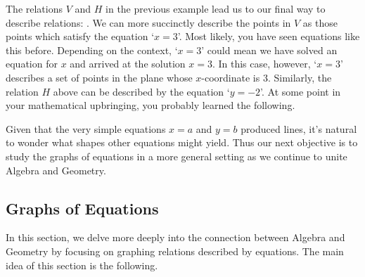 {\begin{enumerate}
\end{enumerate}
}

\medskip

The relations $V$ and $H$ in the previous example lead us to our final way to describe relations:   .  We can more succinctly describe the points in $V$ as those points which satisfy the equation `$x = 3$'.  Most likely, you have seen equations like this before.  Depending on the context, `$x = 3$' could mean we have solved an equation for $x$ and arrived at the solution $x=3$. In this case, however, `$x = 3$' describes a set of points in the plane whose $x$-coordinate is $3$.  Similarly, the relation $H$ above can be described by the equation `$y = -2$'.  At some point in your mathematical upbringing, you probably learned the following.

\medskip


\medskip

Given that the very simple equations $x = a$ and $y = b$ produced lines, it's natural to wonder what shapes other equations might yield.  Thus our next objective is to study the graphs of equations in a more general setting as we continue to unite Algebra and Geometry.

\subsection{Graphs of Equations}

\label{GraphsofEquations}

In this section, we delve more deeply into the connection between Algebra and Geometry by focusing on graphing relations described by equations.  The main idea of this section is the following.

\medskip

